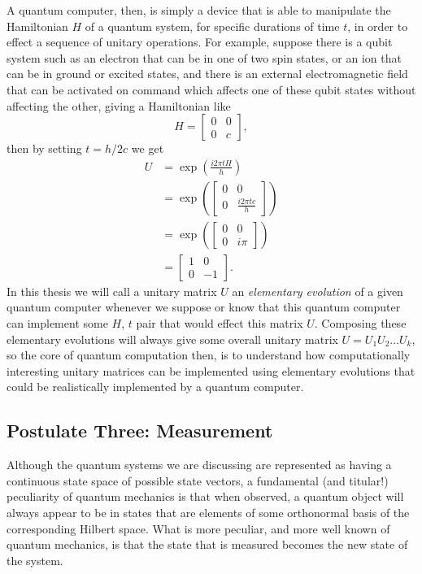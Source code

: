 A quantum computer, then, is simply a device that is able to manipulate the Hamiltonian $H$ of a quantum system, for specific durations of time $t$, in order to effect a sequence of unitary operations. For example, suppose there is a qubit system such as an electron that can be in one of two spin states, or an ion that can be in ground or excited states, and there is an external electromagnetic field that can be activated on command which affects one of these qubit states without affecting the other, giving a Hamiltonian like
\[H = \begin{bmatrix}
0 & 0 \\ 0 & c
\end{bmatrix},\]
then by setting $t = h/2c$ we get
\begin{align*}
U &= \exp\left(\frac{i 2\pi tH}{h}\right)
\\&= \exp\left(\begin{bmatrix}
0 & 0 \\
0 & \frac{i 2\pi tc}{h}
\end{bmatrix}\right)
\\&= \exp\left(\begin{bmatrix}
0 & 0 \\
0 & i\pi
\end{bmatrix}\right)
\\&= \begin{bmatrix}
1 & 0 \\
0 & -1
\end{bmatrix}.
\end{align*}
In this thesis we will call a unitary matrix $U$ an \emph{elementary evolution} of a given quantum computer whenever we suppose or know that this quantum computer can implement some $H$, $t$ pair that would effect this matrix $U$. Composing these elementary evolutions will always give some overall unitary matrix $U = U_1U_2\dots U_k$, so the core of quantum computation then, is to understand how computationally interesting unitary matrices can be implemented using elementary evolutions that could be realistically implemented by a quantum computer.
\subsection{Postulate Three: Measurement}\label{measurement}
Although the quantum systems we are discussing are represented as having a continuous state space of possible state vectors, a fundamental (and titular!) peculiarity of quantum mechanics is that when observed, a quantum object will always appear to be in states that are elements of some orthonormal basis of the corresponding Hilbert space. What is more peculiar, and more well known of quantum mechanics, is that the state that is measured becomes the new state of the system.

